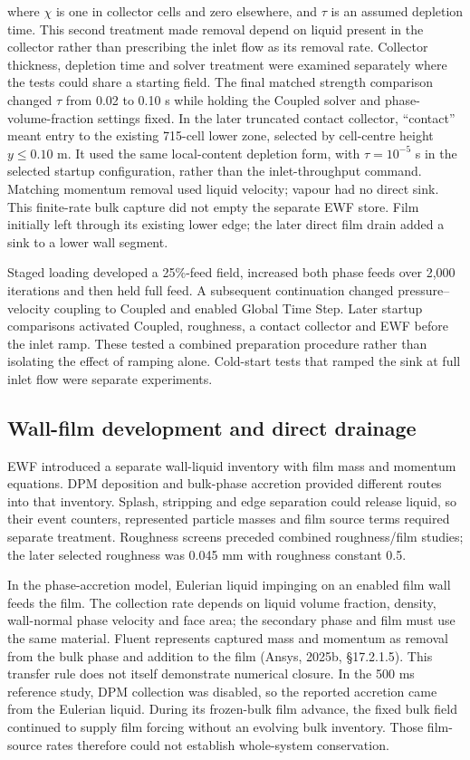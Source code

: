 where \(\chi\) is one in collector cells and zero elsewhere, and \(\tau\) is an assumed depletion time. This second treatment made removal depend on liquid present in the collector rather than prescribing the inlet flow as its removal rate. Collector thickness, depletion time and solver treatment were examined separately where the tests could share a starting field. The final matched strength comparison changed \(\tau\) from 0.02 to 0.10 s while holding the Coupled solver and phase-volume-fraction settings fixed. In the later truncated contact collector, ``contact'' meant entry to the existing 715-cell lower zone, selected by cell-centre height \(y\leq0.10\) m. It used the same local-content depletion form, with \(\tau=10^{-5}\) s in the selected startup configuration, rather than the inlet-throughput command. Matching momentum removal used liquid velocity; vapour had no direct sink. This finite-rate bulk capture did not empty the separate EWF store. Film initially left through its existing lower edge; the later direct film drain added a sink to a lower wall segment.

Staged loading developed a 25\%-feed field, increased both phase feeds over 2,000 iterations and then held full feed. A subsequent continuation changed pressure--velocity coupling to Coupled and enabled Global Time Step. Later startup comparisons activated Coupled, roughness, a contact collector and EWF before the inlet ramp. These tested a combined preparation procedure rather than isolating the effect of ramping alone. Cold-start tests that ramped the sink at full inlet flow were separate experiments.

\subsection{Wall-film development and direct drainage}

EWF introduced a separate wall-liquid inventory with film mass and momentum equations. DPM deposition and bulk-phase accretion provided different routes into that inventory. Splash, stripping and edge separation could release liquid, so their event counters, represented particle masses and film source terms required separate treatment. Roughness screens preceded combined roughness/film studies; the later selected roughness was 0.045 mm with roughness constant 0.5.

In the phase-accretion model, Eulerian liquid impinging on an enabled film wall feeds the film. The collection rate depends on liquid volume fraction, density, wall-normal phase velocity and face area; the secondary phase and film must use the same material. Fluent represents captured mass and momentum as removal from the bulk phase and addition to the film (Ansys, 2025b, §17.2.1.5). This transfer rule does not itself demonstrate numerical closure. In the 500 ms reference study, DPM collection was disabled, so the reported accretion came from the Eulerian liquid. During its frozen-bulk film advance, the fixed bulk field continued to supply film forcing without an evolving bulk inventory. Those film-source rates therefore could not establish whole-system conservation.

